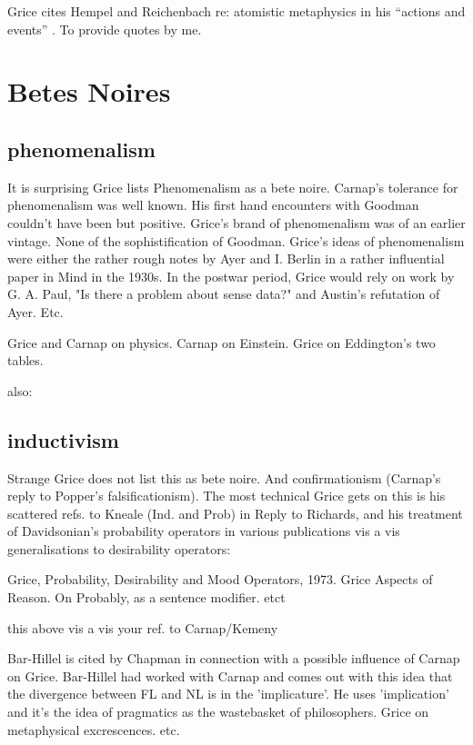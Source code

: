 \documentclass[10pt,titlepage]{book}
\begin{document}
{Grice cites Hempel and Reichenbach re: atomistic metaphysics in his ``actions and events'' \cite{grice86}.
To provide quotes by me.
 
\section{Betes Noires}

\subsection{phenomenalism}

It is surprising Grice lists Phenomenalism as a bete noire. Carnap's  
tolerance for phenomenalism was well known. His first hand encounters with  
Goodman couldn't have been but positive. Grice's brand of phenomenalism was of  
an earlier vintage. None of the sophistification of Goodman. Grice's ideas of 
 phenomenalism were either the rather rough notes by Ayer and I. Berlin in 
a  rather influential paper in Mind in the 1930s. In the postwar period, 
Grice  would rely on work by G. A. Paul, "Is there a problem about sense data?" 
and  Austin's refutation of Ayer. Etc.

Grice and Carnap on physics. Carnap on Einstein. Grice on Eddington's two  
tables.
 
also:
 
\subsection{inductivism}

Strange Grice does not list this as bete noire. And  
confirmationism (Carnap's reply to Popper's falsificationism). The most  technical 
Grice gets on this is his scattered refs. to Kneale (Ind. and Prob) in  Reply 
to Richards, and his treatment of Davidsonian's probability operators in  
various publications vis a vis generalisations to desirability operators: 
 
Grice, Probability, Desirability and Mood Operators, 1973.
Grice Aspects of Reason. On Probably, as a sentence modifier. etct
 
this above vis a vis your ref. to Carnap/Kemeny
 
 
Bar-Hillel is cited by Chapman in connection with a possible influence of  
Carnap on Grice. Bar-Hillel had worked with Carnap and comes out with this 
idea  that the divergence between FL and NL is in the 'implicature'. He uses  
'implication' and it's the idea of pragmatics as the wastebasket of  
philosophers. Grice on metaphysical excrescences. etc. 
 
}
\end{document}
